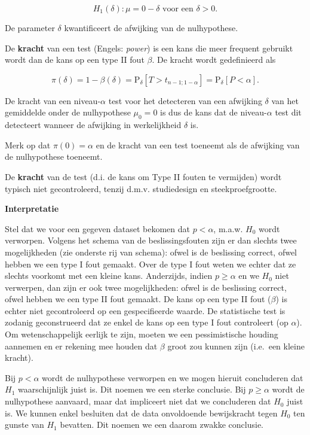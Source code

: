 \documentclass[
  dutch,
  letterpaper,
  12pt]{book}
\theoremstyle{definition}
\theoremstyle{definition}
\theoremstyle{definition}
\theoremstyle{remark}
\begin{document}
\[H_1(\delta): \mu=0-\delta \text{ voor een }\delta>0.\]

De parameter \(\delta\) kwantificeert de afwijking van de nulhypothese.

De \textbf{kracht} van een test (Engels: \emph{power}) is een kans die
meer frequent gebruikt wordt dan de kans op een type II fout \(\beta\).
De kracht wordt gedefinieerd als

\[\pi(\delta) = 1-\beta(\delta) = \text{P}_\delta\left[T>t_{n-1;1-\alpha}\right]=\text{P}_\delta\left[P<\alpha\right].\]

De kracht van een niveau-\(\alpha\) test voor het detecteren van een
afwijking \(\delta\) van het gemiddelde onder de nulhypothese
\(\mu_0=0\) is dus de kans dat de niveau-\(\alpha\) test dit detecteert
wanneer de afwijking in werkelijkheid \(\delta\) is.

Merk op dat \(\pi(0)=\alpha\) en de kracht van een test toeneemt als de
afwijking van de nulhypothese toeneemt.

De \textbf{kracht} van de test (d.i. de kans om Type II fouten te
vermijden) wordt typisch niet gecontroleerd, tenzij d.m.v. studiedesign
en steekproefgrootte.

\textbf{Interpretatie}

Stel dat we voor een gegeven dataset bekomen dat \(p<\alpha\), m.a.w.
\(H_0\) wordt verworpen. Volgens het schema van de beslissingsfouten
zijn er dan slechts twee mogelijkheden (zie onderste rij van schema):
ofwel is de beslissing correct, ofwel hebben we een type I fout gemaakt.
Over de type I fout weten we echter dat ze slechts voorkomt met een
kleine kans. Anderzijds, indien \(p\geq \alpha\) en we \(H_0\) niet
verwerpen, dan zijn er ook twee mogelijkheden: ofwel is de beslissing
correct, ofwel hebben we een type II fout gemaakt. De kans op een type
II fout (\(\beta\)) is echter niet gecontroleerd op een gespecifieerde
waarde. De statistische test is zodanig geconstrueerd dat ze enkel de
kans op een type I fout controleert (op \(\alpha\)). Om wetenschappelijk
eerlijk te zijn, moeten we een pessimistische houding aannemen en er
rekening mee houden dat \(\beta\) groot zou kunnen zijn (i.e.~een kleine
kracht).

Bij \(p < \alpha\) wordt de nulhypothese verworpen en we mogen hieruit
concluderen dat \(H_1\) waarschijnlijk juist is. Dit noemen we een
sterke conclusie. Bij \(p\geq \alpha\) wordt de nulhypothese aanvaard,
maar dat impliceert niet dat we concluderen dat \(H_0\) juist is. We
kunnen enkel besluiten dat de data onvoldoende bewijskracht tegen
\(H_0\) ten gunste van \(H_1\) bevatten. Dit noemen we een daarom zwakke
conclusie.
\end{document}
